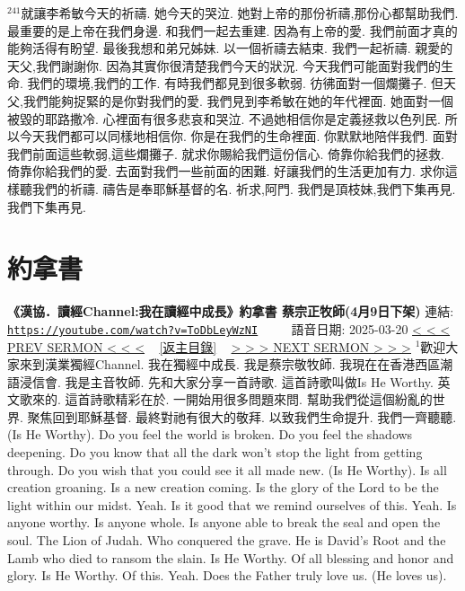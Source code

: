 \documentclass{book}
\begin{document}
$^{241}$就讓李希敏今天的祈禱.
她今天的哭泣.
她對上帝的那份祈禱,那份心都幫助我們.
最重要的是上帝在我們身邊.
和我們一起去重建.
因為有上帝的愛.
我們前面才真的能夠活得有盼望.
最後我想和弟兄姊妹.
以一個祈禱去結束.
我們一起祈禱.
親愛的天父,我們謝謝你.
因為其實你很清楚我們今天的狀況.
今天我們可能面對我們的生命.
我們的環境,我們的工作.
有時我們都見到很多軟弱.
彷彿面對一個爛攤子.
但天父,我們能夠捉緊的是你對我們的愛.
我們見到李希敏在她的年代裡面.
她面對一個被毀的耶路撒冷.
心裡面有很多悲哀和哭泣.
不過她相信你是定義拯救以色列民.
所以今天我們都可以同樣地相信你.
你是在我們的生命裡面.
你默默地陪伴我們.
面對我們前面這些軟弱,這些爛攤子.
就求你賜給我們這份信心.
倚靠你給我們的拯救.
倚靠你給我們的愛.
去面對我們一些前面的困難.
好讓我們的生活更加有力.
求你這樣聽我們的祈禱.
禱告是奉耶穌基督的名.
祈求,阿門.
我們是頂枝妹,我們下集再見.
我們下集再見.
\newpage



\section{約拿書}
\label{sec:ToDbLeyWzNI}
\textbf{《漢協．讀經Channel:我在讀經中成長》約拿書 蔡宗正牧師(4月9日下架)}
\newline
\newline
連結: \href{https://youtube.com/watch?v=ToDbLeyWzNI}{\texttt{https://youtube.com/watch?v=ToDbLeyWzNI}} ~~~~ 語音日期: 2025-03-20
\newline
\newline
\hyperref[sec:0tg98bwxbP8]{\small{< < < PREV SERMON < < <}}
~
\hyperref[sec:index]{\small{[返主目錄]}}
~
\hyperref[sec:sKBiDMdPfrw]{\small{> > > NEXT SERMON > > >}}
\newline
\newline
$^{1}$歡迎大家來到漢業獨經Channel.
我在獨經中成長.
我是蔡宗敬牧師.
我現在在香港西區潮語浸信會.
我是主音牧師.
先和大家分享一首詩歌.
這首詩歌叫做Is He Worthy.
英文歌來的.
這首詩歌精彩在於.
一開始用很多問題來問.
幫助我們從這個紛亂的世界.
聚焦回到耶穌基督.
最終對祂有很大的敬拜.
以致我們生命提升.
我們一齊聽聽.
(Is He Worthy).
Do you feel the world is broken.
Do you feel the shadows deepening.
Do you know that all the dark won't stop the light from getting through.
Do you wish that you could see it all made new.
(Is He Worthy).
Is all creation groaning.
Is a new creation coming.
Is the glory of the Lord to be the light within our midst.
Yeah.
Is it good that we remind ourselves of this.
Yeah.
Is anyone worthy.
Is anyone whole.
Is anyone able to break the seal and open the soul.
The Lion of Judah.
Who conquered the grave.
He is David's Root and the Lamb who died to ransom the slain.
Is He Worthy.
Of all blessing and honor and glory.
Is He Worthy.
Of this.
Yeah.
Does the Father truly love us.
(He loves us).
\end{document}
